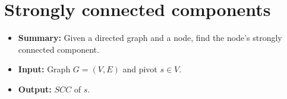 \section{Strongly connected components} \label{algorithm-scc}
\begin{itemize}
    \item \textbf{Summary:} Given a directed graph and a node, find the node's strongly connected component.
    \item \textbf{Input:} Graph $G=(V,E)$ and pivot $s \in V$.
    \item \textbf{Output:} $SCC$ of $s$.
\end{itemize}



